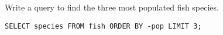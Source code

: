 \begin{blocksection}
\question Write a query to find the three most populated fish species.

\begin{solution}[0.7in]
\begin{lstlisting}
SELECT species FROM fish ORDER BY -pop LIMIT 3;
\end{lstlisting}
\end{solution}
\end{blocksection}
